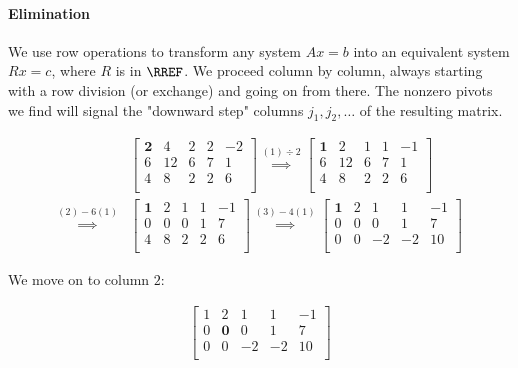 \paragraph{Elimination} We use row operations to transform any
system $Ax=b$ into an equivalent system $Rx=c$, where $R$ is in
$\RREF$. We proceed column by column, always starting with a row
division (or exchange) and going on from there. The nonzero pivots
we find will signal the "downward step" columns $j_1,j_2,\dots$ of
the resulting matrix.

\vspace{-\baselineskip}

\begin{align*}
    &\begin{bmatrix}
        \mathbf{2} & 4  & 2 & 2 & -2 \\
        6          & 12 & 6 & 7 & 1  \\
        4          & 8  & 2 & 2 & 6  \\
    \end{bmatrix}
    \stackrel{(1)\div2}{\implies}
    \begin{bmatrix}
        \mathbf{1} & 2  & 1 & 1 & -1 \\
        6          & 12 & 6 & 7 & 1  \\
        4          & 8  & 2 & 2 & 6  \\
    \end{bmatrix}
    \\
    \stackrel{(2)-6(1)}{\implies}
    &\begin{bmatrix}
        \mathbf{1} & 2 & 1 & 1 & -1 \\
        0          & 0 & 0 & 1 & 7  \\
        4          & 8 & 2 & 2 & 6  \\
    \end{bmatrix}
    \stackrel{(3)-4(1)}{\implies}
    \begin{bmatrix}
        \mathbf{1} & 2 & 1  & 1  & -1 \\
        0          & 0 & 0  & 1  & 7  \\
        0          & 0 & -2 & -2 & 10 \\
    \end{bmatrix}
\end{align*}

We move on to column $2$:

\vspace{-\baselineskip}

\begin{align*}
    \begin{bmatrix}
        1 & 2          & 1  & 1  & -1 \\
        0 & \mathbf{0} & 0  & 1  & 7  \\
        0 & 0          & -2 & -2 & 10 \\
    \end{bmatrix}
\end{align*}

